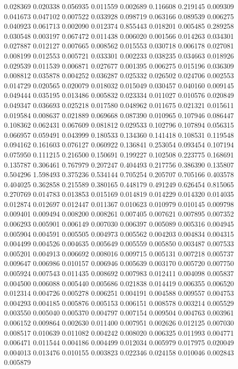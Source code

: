 0.028369
0.020338
0.056935
0.011559
0.002689
0.116608
0.219145
0.009309
0.041673
0.047102
0.007522
0.033928
0.098719
0.063166
0.089539
0.006275
0.040923
0.061713
0.002090
0.012374
0.855443
0.018201
0.005485
0.289258
0.030548
0.003197
0.067472
0.011438
0.006020
0.001566
0.014263
0.034301
0.027887
0.012127
0.007665
0.008562
0.015553
0.030718
0.006178
0.027081
0.008199
0.012553
0.005721
0.033301
0.002233
0.038235
0.034663
0.018926
0.029539
0.011539
0.006871
0.027677
0.001395
0.006275
0.015196
0.036309
0.008812
0.035878
0.004252
0.036287
0.025332
0.026502
0.024706
0.002553
0.014729
0.020565
0.020079
0.018032
0.015049
0.030457
0.040160
0.009145
0.049444
0.035195
0.013486
0.005832
0.023334
0.011027
0.010576
0.020849
0.049347
0.036693
0.025218
0.017580
0.048962
0.011675
0.021321
0.015611
0.019584
0.008637
0.021889
0.069668
0.087390
0.010965
0.107946
0.086447
0.108362
0.062431
0.067609
0.081812
0.029533
0.102796
0.107894
0.056315
0.066957
0.059491
0.043999
0.180533
0.134360
0.141418
0.108531
0.119548
0.094162
0.161603
0.076127
0.060922
0.136841
0.253054
0.093454
0.107194
0.075950
0.111215
0.216500
0.150691
0.199227
0.102508
0.223775
0.168691
0.135787
0.306461
0.767979
0.207247
0.404493
0.217756
0.386390
0.135807
0.504296
1.598493
0.375236
0.534144
0.705254
0.205707
0.705166
0.403578
0.404025
0.362858
0.215589
0.380165
0.448179
0.491249
0.626454
0.815065
0.270769
0.014783
0.013853
0.015169
0.014819
0.014229
0.014320
0.014035
0.012874
0.012697
0.012447
0.011367
0.010623
0.010979
0.010145
0.009798
0.009401
0.009494
0.008200
0.008261
0.007405
0.007621
0.007895
0.007352
0.006293
0.005901
0.006149
0.007030
0.006397
0.005089
0.005316
0.004945
0.005904
0.004591
0.005505
0.004973
0.005562
0.004203
0.004834
0.004315
0.004499
0.004526
0.004635
0.005649
0.005559
0.005850
0.003487
0.007533
0.005201
0.004913
0.006692
0.008016
0.009715
0.005131
0.007218
0.005737
0.009647
0.006986
0.010157
0.006946
0.005639
0.003170
0.005720
0.007750
0.005924
0.007543
0.011435
0.008692
0.007983
0.012411
0.004098
0.005837
0.004500
0.006088
0.005440
0.005686
0.021838
0.014419
0.006355
0.006520
0.012314
0.004726
0.005278
0.006251
0.004191
0.004588
0.009557
0.004753
0.004293
0.004185
0.005876
0.005153
0.006151
0.008578
0.003214
0.005529
0.003550
0.005040
0.005370
0.004797
0.007154
0.009504
0.004763
0.003961
0.006152
0.009864
0.002630
0.011400
0.007951
0.002626
0.012125
0.007030
0.008517
0.010639
0.011082
0.004242
0.008020
0.006325
0.011993
0.004771
0.006471
0.011544
0.004186
0.004499
0.012034
0.005979
0.017975
0.020049
0.004013
0.013476
0.010155
0.003823
0.022346
0.024158
0.010046
0.002843
0.005879
